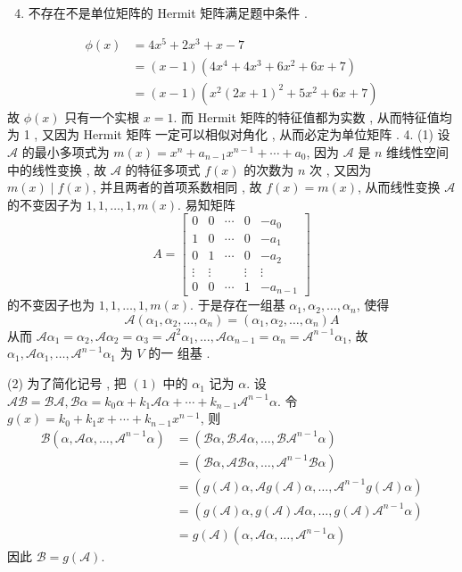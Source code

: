 \documentclass[10pt]{article}
\begin{document}
\begin{enumerate}
  \setcounter{enumi}{3}
  \item  不存在不是单位矩阵的  Hermit  矩阵满足题中条件 .
\end{enumerate}
$$
\begin{aligned}
\phi(x) &=4 x^{5}+2 x^{3}+x-7 \\
&=(x-1)\left(4 x^{4}+4 x^{3}+6 x^{2}+6 x+7\right) \\
&=(x-1)\left(x^{2}(2 x+1)^{2}+5 x^{2}+6 x+7\right)
\end{aligned}
$$
 故  $\phi(x)$  只有一个实根  $x=1$.  而  Hermit  矩阵的特征值都为实数 ,  从而特征值均为  1 ,  又因为  Hermit  矩阵   一定可以相似对角化 ,  从而必定为单位矩阵 . 4. (1)  设  $\mathcal{A}$  的最小多项式为  $m(x)=x^{n}+a_{n-1} x^{n-1}+\cdots+a_{0}$,  因为  $\mathcal{A}$  是  $n$  维线性空间中的线性变换 ,  故  $\mathcal{A}$  的特征多项式  $f(x)$  的次数为  $n$  次 ,  又因为  $m(x) \mid f(x)$,  并且两者的首项系数相同 ,  故  $f(x)=m(x)$,  从而线性变换  $\mathcal{A}$  的不变因子为  $1,1, \ldots, 1, m(x)$.  易知矩阵 
$$
A=\left[\begin{array}{ccccc}
0 & 0 & \cdots & 0 & -a_{0} \\
1 & 0 & \cdots & 0 & -a_{1} \\
0 & 1 & \cdots & 0 & -a_{2} \\
\vdots & \vdots & & \vdots & \vdots \\
0 & 0 & \cdots & 1 & -a_{n-1}
\end{array}\right]
$$
 的不变因子也为  $1,1, \ldots, 1, m(x)$.  于是存在一组基  $\alpha_{1}, \alpha_{2}, \ldots, \alpha_{n}$,  使得 
$$
\mathcal{A}\left(\alpha_{1}, \alpha_{2}, \ldots, \alpha_{n}\right)=\left(\alpha_{1}, \alpha_{2}, \ldots, \alpha_{n}\right) A
$$
 从而  $\mathcal{A} \alpha_{1}=\alpha_{2}, \mathcal{A} \alpha_{2}=\alpha_{3}=\mathcal{A}^{2} \alpha_{1}, \ldots, \mathcal{A} \alpha_{n-1}=\alpha_{n}=\mathcal{A}^{n-1} \alpha_{1}$,  故  $\alpha_{1}, \mathcal{A} \alpha_{1}, \ldots, \mathcal{A}^{n-1} \alpha_{1}$  为  $V$  的一   组基 .

(2)  为了简化记号 ,  把  $(1)$  中的  $\alpha_{1}$  记为  $\alpha$.  设  $\mathcal{A B}=\mathcal{B} \mathcal{A}, \mathcal{B} \alpha=k_{0} \alpha+k_{1} \mathcal{A} \alpha+\cdots+k_{n-1} \mathcal{A}^{n-1} \alpha$.  令  $g(x)=k_{0}+k_{1} x+\cdots+k_{n-1} x^{n-1}$,  则 
$$
\begin{aligned}
\mathcal{B}\left(\alpha, \mathcal{A} \alpha, \ldots, \mathcal{A}^{n-1} \alpha\right) &=\left(\mathcal{B} \alpha, \mathcal{B} \mathcal{A} \alpha, \ldots, \mathcal{B} \mathcal{A}^{n-1} \alpha\right) \\
&=\left(\mathcal{B} \alpha, \mathcal{A B} \alpha, \ldots, \mathcal{A}^{n-1} \mathcal{B} \alpha\right) \\
&=\left(g(\mathcal{A}) \alpha, \mathcal{A} g(\mathcal{A}) \alpha, \ldots, \mathcal{A}^{n-1} g(\mathcal{A}) \alpha\right) \\
&=\left(g(\mathcal{A}) \alpha, g(\mathcal{A}) \mathcal{A} \alpha, \ldots, g(\mathcal{A}) \mathcal{A}^{n-1} \alpha\right) \\
&=g(\mathcal{A})\left(\alpha, \mathcal{A} \alpha, \ldots, \mathcal{A}^{n-1} \alpha\right)
\end{aligned}
$$
 因此  $\mathcal{B}=g(\mathcal{A})$.
\end{document}
